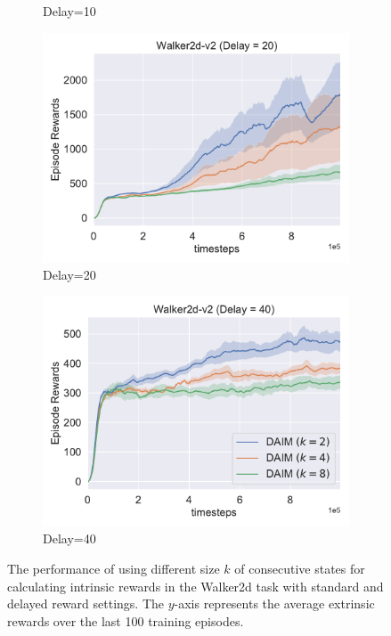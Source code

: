 \begin{figure}[h!]
\begin{subfigure}[t]{0.49\textwidth}
    \caption{Delay=10}
  \end{subfigure}\hfill
  \begin{subfigure}[t]{0.49\textwidth}
    \includegraphics[width=\textwidth]{figures/chapter5/multi_frames/delay20.pdf}
    \caption{Delay=20}
  \end{subfigure}\hfill
  \begin{subfigure}[t]{0.49\textwidth}
    \includegraphics[width=\textwidth]{figures/chapter5/multi_frames/delay40.pdf}
    \caption{Delay=40}
  \end{subfigure}\hfill
  \caption[Results of using different length of consecutive states for calculating the intrinsic reward.]{The performance of using different size $k$ of consecutive states for calculating intrinsic rewards in the Walker2d task with standard and delayed reward settings.  The $y$-axis represents the average extrinsic rewards over the last 100 training episodes.} 
  \label{fig:multi_frames}
\end{figure}

